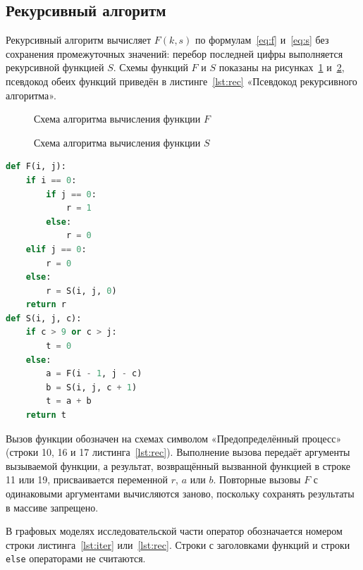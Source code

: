 \subsection{Рекурсивный алгоритм}

Рекурсивный алгоритм вычисляет $F(k,s)$ по формулам~\eqref{eq:f}
и~\eqref{eq:s} без сохранения промежуточных значений: перебор последней цифры
выполняется рекурсивной функцией $S$. Схемы функций $F$ и $S$ показаны
на рисунках~\ref{fig:scheme-f} и~\ref{fig:scheme-s}, псевдокод обеих функций
приведён в листинге~\ref{lst:rec} «Псевдокод рекурсивного алгоритма».

\begin{figure}[H]
    \centering
    
    \caption{Схема алгоритма вычисления функции $F$}
    \label{fig:scheme-f}
\end{figure}

\begin{figure}[H]
    \centering
    
    \caption{Схема алгоритма вычисления функции $S$}
    \label{fig:scheme-s}
\end{figure}

\bigskip
\noindent\begin{minipage}{\dimexpr\linewidth-0.5mm\relax}
\begin{lstlisting}[language=Python,caption={Псевдокод рекурсивного алгоритма},label={lst:rec}]
def F(i, j):
    if i == 0:
        if j == 0:
            r = 1
        else:
            r = 0
    elif j == 0:
        r = 0
    else:
        r = S(i, j, 0)
    return r
def S(i, j, c):
    if c > 9 or c > j:
        t = 0
    else:
        a = F(i - 1, j - c)
        b = S(i, j, c + 1)
        t = a + b
    return t
\end{lstlisting}
\end{minipage}
\medskip

Вызов функции обозначен на схемах символом «Предопределённый процесс»
(строки 10, 16 и 17 листинга~\ref{lst:rec}). Выполнение вызова передаёт
аргументы вызываемой функции, а результат, возвращённый вызванной функцией
в строке 11 или 19, присваивается переменной $r$, $a$ или $b$. Повторные вызовы $F$
с одинаковыми аргументами вычисляются заново, поскольку сохранять результаты
в массиве запрещено.

В графовых моделях исследовательской части оператор обозначается номером
строки листинга~\ref{lst:iter} или~\ref{lst:rec}. Строки с заголовками
функций и строки \texttt{else} операторами не считаются.
